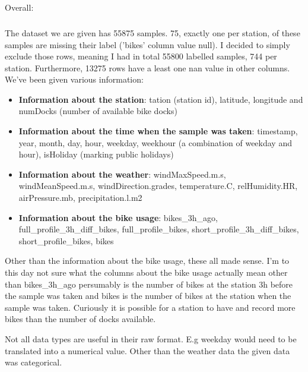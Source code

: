 \documentclass[a4paper]{article}
\begin{document}
    \subsection*{}
    Overall:

    \subsubsection*{}
    The dataset we are given has 55875 samples. 75, exactly one per station, of these samples are missing their label ('bikes'
    column value null).
    I decided to simply exclude those rows, meaning I had in total 55800 labelled samples, 744 per station. Furthermore,
    13275 rows have a least one nan value in other columns.
    We've been given various information:
    \begin{itemize}
        \item \textbf{Information about the station}: tation (station id), latitude, longitude and
        numDocks (number of available bike docks)
        \item \textbf{Information about the time when the sample was taken}: timestamp, year, month, day, hour,
        weekday, weekhour (a combination of weekday and hour), isHoliday (marking public holidays)
        \item \textbf{Information about the weather}: windMaxSpeed.m.s, windMeanSpeed.m.s,  windDirection.grades,
        temperature.C, relHumidity.HR, airPressure.mb, precipitation.l.m2
        \item \textbf{Information about the bike usage}: bikes\_3h\_ago, full\_profile\_3h\_diff\_bikes,
        full\_profile\_bikes, short\_profile\_3h\_diff\_bikes, short\_profile\_bikes, bikes
    \end{itemize}

    Other than the information about the bike usage, these all made sense. I'm to this day not sure what the columns
    about the bike usage actually mean other than bikes\_3h\_ago persumably is the number of bikes at the station 3h
    before the sample was taken and bikes is the number of bikes at the station when the sample was taken. Curiously it
    is possible for a station to have and record more bikes than the number of docks available.

    Not all data types are useful in their raw format. E.g weekday would need to be translated into a numerical value.
    Other than the weather data the given data was categorical.
\end{document}
